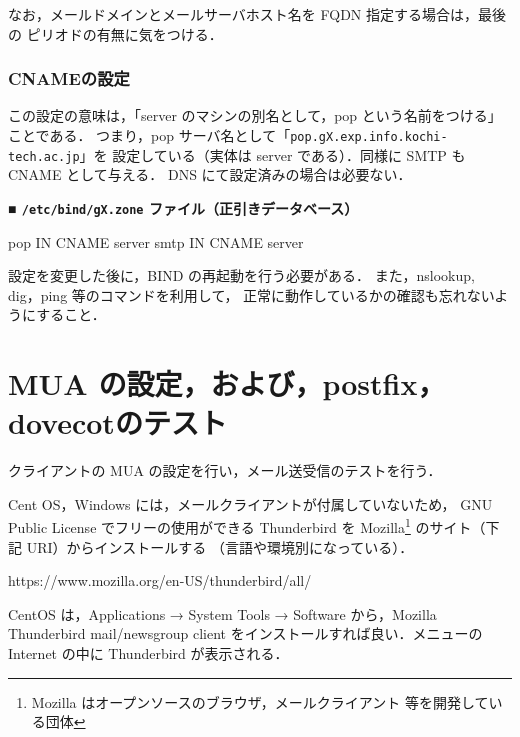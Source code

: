 なお，メールドメインとメールサーバホスト名を FQDN 指定する場合は，最後の
ピリオドの有無に気をつける．

\subsubsection{CNAMEの設定}
この設定の意味は，「server のマシンの別名として，pop という名前をつける」ことである．
つまり，pop サーバ名として「\texttt{pop.gX.exp.info.kochi-tech.ac.jp}」を
設定している（実体は server である）．同様に SMTP も CNAME として与える．
DNS にて設定済みの場合は必要ない．

\noindent
{\bf ■ \texttt{/etc/bind/gX.zone} ファイル（正引きデータベース）}
\begin{cli}
pop       IN      CNAME   server
smtp       IN      CNAME   server
\end{cli}

設定を変更した後に，BIND の再起動を行う必要がある．
また，nslookup, dig，ping 等のコマンドを利用して，
正常に動作しているかの確認も忘れないようにすること．

\section{MUA の設定，および，postfix，dovecotのテスト}
クライアントの MUA の設定を行い，メール送受信のテストを行う．

Cent OS，Windows には，メールクライアントが付属していないため，
GNU Public License でフリーの使用ができる Thunderbird を
Mozilla\footnote{Mozilla はオープンソースのブラウザ，メールクライアント
等を開発している団体} のサイト（下記 URI）からインストールする
（言語や環境別になっている）．

\begin{center}
https://www.mozilla.org/en-US/thunderbird/all/ 
\end{center}

CentOS は，Applications → System Tools → Software から，Mozilla
Thunderbird mail/newsgroup client をインストールすれば良い．メニューの 
Internet の中に Thunderbird が表示される．

